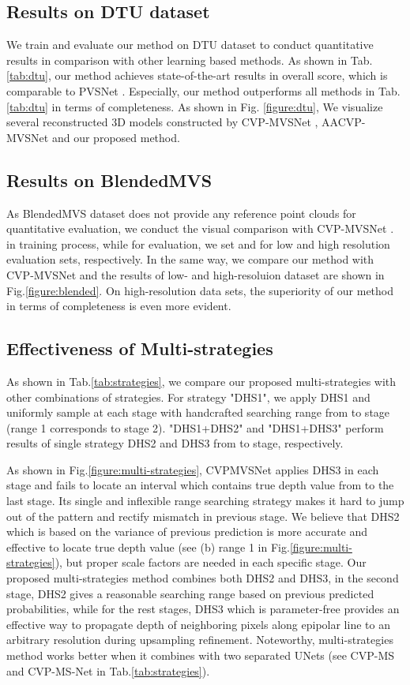 \documentclass{article}
\begin{document}
\subsection{Results on DTU dataset}
We train and evaluate our method on DTU dataset to conduct quantitative results in comparison with other learning based methods.
As shown in Tab.\ref{tab:dtu}, our method achieves state-of-the-art results in overall score, which is comparable to PVSNet \cite{xu2020pvsnet}.
Especially, our method outperforms all methods in Tab. \ref{tab:dtu} in terms of completeness.
As shown in Fig. \ref{figure:dtu}, We visualize several reconstructed 3D models constructed by CVP-MVSNet \cite{yang2020cost}, AACVP-MVSNet \cite{yu2021attention} and our proposed method.

\subsection{Results on BlendedMVS}
As BlendedMVS dataset does not provide any reference point clouds for quantitative evaluation, we conduct the visual comparison with CVP-MVSNet \cite{yang2020cost}.
 in training process, while for evaluation, we set  and  for low and high resolution evaluation sets, respectively.
In the same way, we compare our method with CVP-MVSNet \cite{yang2020cost} and the results of low- and high-resoluion dataset are shown in Fig.\ref{figure:blended}.
On high-resolution data sets, the superiority of our method in terms of completeness is even more evident.

\subsection{Effectiveness of Multi-strategies}
As shown in Tab.\ref{tab:strategies}, we compare our proposed multi-strategies with other combinations of strategies. 
For strategy "DHS1", we apply DHS1 and uniformly sample at each stage with handcrafted searching range  from  to  stage (range 1 corresponds to stage 2).
"DHS1+DHS2" and "DHS1+DHS3" perform results of single strategy DHS2 and DHS3 from  to  stage, respectively.

As shown in Fig.\ref{figure:multi-strategies}, CVPMVSNet \cite{yang2020cost} applies DHS3 in each stage and fails to locate an interval which contains true depth value from  to the last stage.
Its single and inflexible range searching strategy makes it hard to jump out of the pattern and rectify mismatch in previous stage.
We believe that DHS2 which is based on the variance of previous prediction is more accurate and effective to locate true depth value (see (b) range 1 in Fig.\ref{figure:multi-strategies}), but proper scale factors are needed in each specific stage.
Our proposed multi-strategies method combines both DHS2 and DHS3, in the second stage, DHS2 gives a reasonable searching range based on previous predicted probabilities, while for the rest stages, DHS3 which is parameter-free provides an effective way to propagate depth of neighboring pixels along epipolar line to an arbitrary resolution during upsampling refinement.
Noteworthy, multi-strategies method works better when it combines with two separated UNets (see CVP-MS and CVP-MS-Net in Tab.\ref{tab:strategies}).
\end{document}
